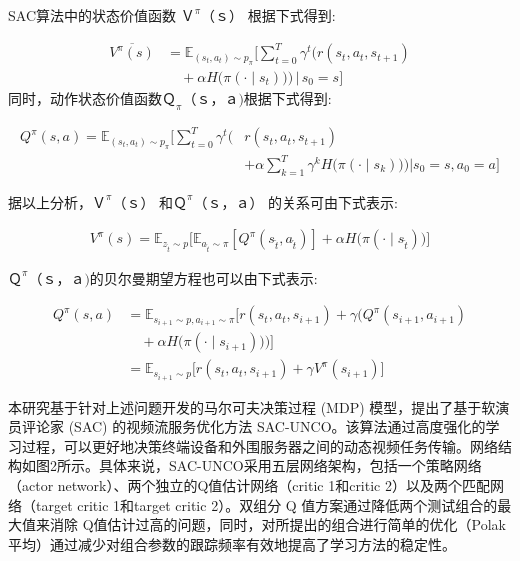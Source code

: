 SAC算法中的状态价值函数 \(Ｖ^π（ｓ）\) 根据下式得到:

\begin{align}
	\overline{V^{\pi}(s)} 
	&= \mathbb{E}_{(s_t, a_t) \sim p_{\pi}} \Bigg[ \sum_{t=0}^{T} \gamma^t \bigg( r(s_t, a_t, s_{t+1}) \\
	&\quad + \alpha H\big(\pi({\cdot} \mid s_t)\big) \bigg) \,\bigg|\, s_0 = s \Bigg]
\end{align}
同时，动作状态价值函数\(Ｑ_π（ ｓ，ａ)\)根据下式得到:

\begin{equation}
	\begin{aligned}
		Q^{\pi}(s, a) = \mathbb{E}_{(s_t, a_t) \sim p_{\pi}} \Bigg[ 
		\sum_{t=0}^{T} \gamma^t \bigg( &r(s_t, a_t, s_{t+1}) \\
		&+ \alpha \sum_{k=1}^{T} \gamma^k H\big(\pi({\cdot} \mid s_k)\big) \bigg) \Bigg| s_0 = s, a_0 = a \Bigg]
	\end{aligned}
\end{equation}

据以上分析，\(Ｖ^π（ ｓ）\) 和\(Ｑ^π（ ｓ，ａ）\) 的关系可由下式表示:

\begin{equation}
	\begin{aligned}
		V^{\pi}(s) = \mathbb{E}_{z_{\hat{t}} \sim p} \Bigg[ 
		\mathbb{E}_{a_{\hat{t}} \sim \pi} \left[ Q^{\pi}(s_{\hat{t}}, a_{\hat{t}}) \right] 
		+ \alpha H\big(\pi({\cdot} \mid s_{\hat{t}})\big) 
		\Bigg]
	\end{aligned}
\end{equation}

\(Ｑ^π（ ｓ，ａ)\)的贝尔曼期望方程也可以由下式表示:

\begin{align}
	Q^{\pi}(s, a) 
	&= \mathbb{E}_{s_{i+1} \sim p, a_{i+1} \sim \pi} \Big[ r(s_t, a_t, s_{i+1}) + \gamma \Big( Q^{\pi}(s_{i+1}, a_{i+1}) \nonumber \\
	&\quad + \alpha H\big(\pi({\cdot} \mid s_{i+1})\big) \Big) \Big] \nonumber \\
	&= \mathbb{E}_{s_{i+1} \sim p} \Big[ r(s_t, a_t, s_{i+1}) + \gamma V^{\pi}(s_{i+1}) \Big]
\end{align}

本研究基于针对上述问题开发的马尔可夫决策过程 (MDP) 模型，提出了基于软演员评论家 (SAC) 的视频流服务优化方法 SAC-UNCO。该算法通过高度强化的学习过程，可以更好地决策终端设备和外围服务器之间的动态视频任务传输。网络结构如图2所示。具体来说，SAC-UNCO采用五层网络架构，包括一个策略网络（actor network）、两个独立的Q值估计网络（critic 1和critic 2）以及两个匹配网络（target critic 1和target critic 2）。双组分 Q 值方案通过降低两个测试组合的最大值来消除 Q值估计过高的问题，同时，对所提出的组合进行简单的优化（Polak 平均）通过减少对组合参数的跟踪频率有效地提高了学习方法的稳定性。

